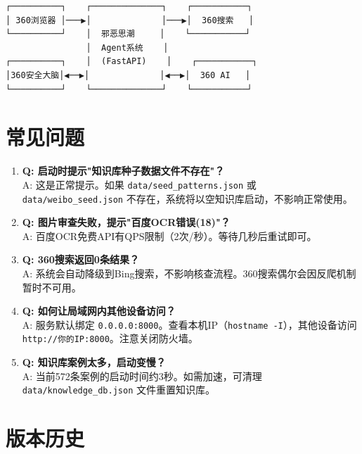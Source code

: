 \documentclass[12pt,a4paper]{ctexart}
\begin{document}
\begin{verbatim}
┌──────────┐    ┌──────────────┐    ┌───────────┐
│ 360浏览器 │───▶│              │───▶│  360搜索   │
└──────────┘    │  邪恶思潮     │    └───────────┘
                │  Agent系统    │
┌──────────┐    │  (FastAPI)    │    ┌───────────┐
│360安全大脑│◀──▶│              │◀──▶│  360 AI   │
└──────────┘    └──────────────┘    └───────────┘
\end{verbatim}

\section{常见问题}

\begin{enumerate}[leftmargin=*]

\item \textbf{Q: 启动时提示"知识库种子数据文件不存在"？}\\
A: 这是正常提示。如果 \texttt{data/seed\_patterns.json} 或 \texttt{data/weibo\_seed.json} 不存在，系统将以空知识库启动，不影响正常使用。

\item \textbf{Q: 图片审查失败，提示"百度OCR错误(18)"？}\\
A: 百度OCR免费API有QPS限制（2次/秒）。等待几秒后重试即可。

\item \textbf{Q: 360搜索返回0条结果？}\\
A: 系统会自动降级到Bing搜索，不影响核查流程。360搜索偶尔会因反爬机制暂时不可用。

\item \textbf{Q: 如何让局域网内其他设备访问？}\\
A: 服务默认绑定 \texttt{0.0.0.0:8000}。查看本机IP（\texttt{hostname -I}），其他设备访问 \texttt{http://你的IP:8000}。注意关闭防火墙。

\item \textbf{Q: 知识库案例太多，启动变慢？}\\
A: 当前572条案例的启动时间约3秒。如需加速，可清理 \texttt{data/knowledge\_db.json} 文件重置知识库。

\end{enumerate}

\section{版本历史}
\end{document}
